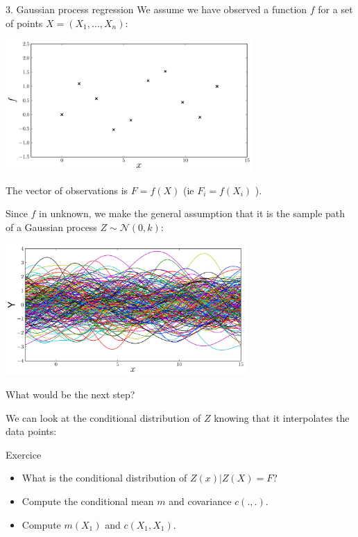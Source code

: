 \documentclass{beamer}
\begin{document}
\begin{frame}{3. Gaussian process regression}
We assume we have observed a function $f$ for a set of points $X = (X_1,\dots,X_n)$:
\begin{center}
\includegraphics[height=5cm]{figures/R/Fig1-data}
\end{center}
The vector of observations is $F=f(X)$ (ie $F_i = f(X_i)$ ).
\end{frame}

\begin{frame}{}
Since $f$ in unknown, we make the general assumption that
it is the sample path of a Gaussian process $Z \sim \mathcal{N}(0,k)$:
\begin{center}
\includegraphics[height=5cm]{figures/R/Fig1b-sim}
\end{center}
What would be the next step? 
\end{frame}

\begin{frame}{}
We can look at the conditional distribution of $Z$ knowing that it interpolates the data points: 
\begin{exampleblock}{Exercice}
\begin{itemize}
	\item[1.] What is the conditional distribution of $Z(x)|Z(X)=F$?
	\item[2.] Compute the conditional mean $m$ and covariance $c(.,.)$.
	\item[3.] Compute $m(X_1)$ and $c(X_1,X_1)$.
\end{itemize}
\end{exampleblock}
\end{frame}
\end{document}

